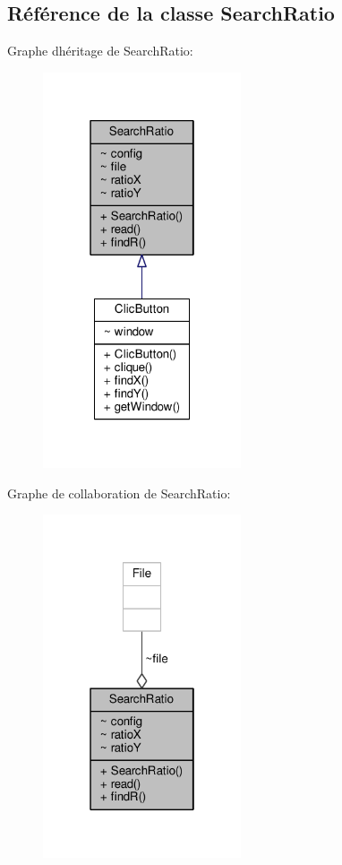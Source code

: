 \hypertarget{classSearchRatio}{}\subsection{Référence de la classe Search\+Ratio}
\label{classSearchRatio}


Graphe d\textquotesingle{}héritage de Search\+Ratio\+:\nopagebreak
\begin{figure}[H]
\begin{center}
\leavevmode
\includegraphics[width=166pt]{classSearchRatio__inherit__graph}
\end{center}
\end{figure}


Graphe de collaboration de Search\+Ratio\+:\nopagebreak
\begin{figure}[H]
\begin{center}
\leavevmode
\includegraphics[width=166pt]{classSearchRatio__coll__graph}
\end{center}
\end{figure}
